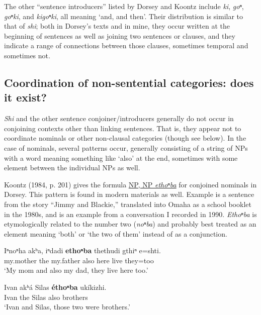 \documentclass[output=paper]{LSP/langsci}
\begin{document}
The other ``sentence introducers'' listed by Dorsey and Koontz include \textit{ki}, \textit{goⁿ}, \textit{goⁿki}, and \textit{kigoⁿki}, all meaning `and, and then'. Their distribution is similar to that of \textit{shi}; both in Dorsey's texts and in mine, they occur written at the beginning of sentences as well as joining two sentences or clauses, and they indicate a range of connections between those clauses, sometimes temporal and sometimes not. 

\subsection{Coordination of non-sentential categories: does it exist?}

\textit{Shi} and the other sentence conjoiner/introducers generally do not occur in conjoining contexts other than linking sentences. That is, they appear not to coordinate nominals or other non-clausal categories (though see  below).  In the case of nominals, several patterns occur, generally consisting of a string of NPs with a word meaning something like `also' at the end, sometimes with some element between the individual NPs as well.  

Koontz (1984, p. 201) gives the formula \underline{NP, NP \textit{ethoⁿba}} for conjoined nominals in Dorsey.  This pattern is found in modern materials as well.  Example  is a sentence from the story ``Jimmy and Blackie,'' translated into Omaha as a school booklet in the 1980s, and  is an example from a conversation I recorded in 1990. \textit{Ethoⁿba} is etymologically related to the number two (\textit{noⁿba}) and probably best treated as an element meaning `both' or `the two of them' instead of as a conjunction.

\begin{exe}
\ex 
\gll  Iⁿnoⁿha  	akʰa, iⁿdadi    \textbf{ethoⁿba} 	thethudi 	gthiⁿ 	e=shti.  \\
	my.mother 	the  	my.father 	also        	here       	live   	they=too\\
\trans `My mom and also my dad, they live here too.'

\ex 
\gll  Ivan 	akʰ\'a Silas 	\textbf{\'ethoⁿba} uk\'ikizhi. \\         
Ivan the   Silas	 also       	brothers\\
\trans`Ivan and Silas, those two were brothers.'
\end{exe}
\end{document}
